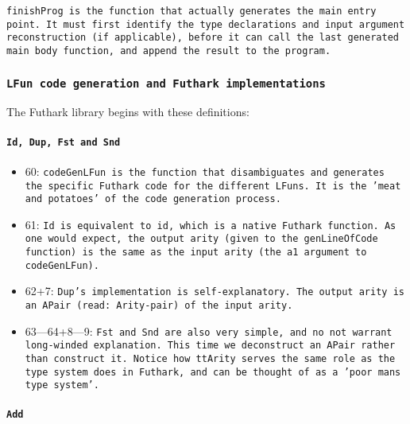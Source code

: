 
\tt{finishProg} is the function that actually generates the main entry point.
It must first identify the type declarations and input argument
reconstruction (if applicable), before it can call the last generated main
body function, and append the result to the program.

\subsubsection{\tt{LFun} code generation and Futhark implementations}
The Futhark library begins with these definitions:

\paragraph{\tt{Id}, \tt{Dup}, \tt{Fst} and \tt{Snd}}

\begin{itemize}
	\item 60: \tt{codeGenLFun} is the function that disambiguates and
	generates the specific Futhark code for the different \tt{LFun}s.
	It is the 'meat and potatoes' of the code generation process.
	\item 61: \tt{Id} is equivalent to \tt{id}, which is a native Futhark
	function. As one would expect, the output arity (given to the
	\tt{genLineOfCode} function) is the same as the input arity (the
	\tt{a1} argument to \tt{codeGenLFun}).
	\item 62+7: \tt{Dup}'s implementation is self-explanatory. The
	output arity is an \tt{APair} (read: \tt{Arity}-pair) of the input arity.
	\item 63---64+8---9: \tt{Fst} and \tt{Snd} are also very simple, and no
	not warrant long-winded explanation. This time we deconstruct an
	\tt{APair} rather than construct it. Notice how tt{Arity} serves the same
	role as the type system does in Futhark, and can be thought of as
	a 'poor mans type system'.
\end{itemize}


\paragraph{\tt{Add}}



